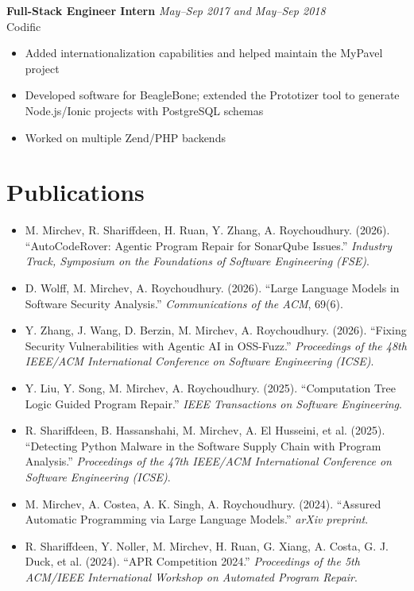 \documentclass[10pt,a4paper]{article}
\newcommand{\entry}[2]{%
  \noindent\textbf{#1} \hfill \textit{#2}\\[0.1em]
}
\begin{document}
\vspace{0.3em}
\entry{Full-Stack Engineer Intern}{May--Sep 2017 and May--Sep 2018}
Codific
\begin{itemize}
  \item Added internationalization capabilities and helped maintain the MyPavel project
  \item Developed software for BeagleBone; extended the Prototizer tool to generate Node.js/Ionic projects with PostgreSQL schemas
  \item Worked on multiple Zend/PHP backends
\end{itemize}

\section*{Publications}
\begin{itemize}[leftmargin=1.1em]
  \item M. Mirchev, R. Shariffdeen, H. Ruan, Y. Zhang, A. Roychoudhury. (2026). ``AutoCodeRover: Agentic Program Repair for SonarQube Issues.'' \textit{Industry Track, Symposium on the Foundations of Software Engineering (FSE)}.
  \item D. Wolff, M. Mirchev, A. Roychoudhury. (2026). ``Large Language Models in Software Security Analysis.'' \textit{Communications of the ACM}, 69(6).
  \item Y. Zhang, J. Wang, D. Berzin, M. Mirchev, A. Roychoudhury. (2026). ``Fixing Security Vulnerabilities with Agentic AI in OSS-Fuzz.'' \textit{Proceedings of the 48th IEEE/ACM International Conference on Software Engineering (ICSE)}.
  \item Y. Liu, Y. Song, M. Mirchev, A. Roychoudhury. (2025). ``Computation Tree Logic Guided Program Repair.'' \textit{IEEE Transactions on Software Engineering}.
  \item R. Shariffdeen, B. Hassanshahi, M. Mirchev, A. El Husseini, et al. (2025). ``Detecting Python Malware in the Software Supply Chain with Program Analysis.'' \textit{Proceedings of the 47th IEEE/ACM International Conference on Software Engineering (ICSE)}.
  \item M. Mirchev, A. Costea, A. K. Singh, A. Roychoudhury. (2024). ``Assured Automatic Programming via Large Language Models.'' \textit{arXiv preprint}.
  \item R. Shariffdeen, Y. Noller, M. Mirchev, H. Ruan, G. Xiang, A. Costa, G. J. Duck, et al. (2024). ``APR Competition 2024.'' \textit{Proceedings of the 5th ACM/IEEE International Workshop on Automated Program Repair}.

\end{itemize}
\end{document}
